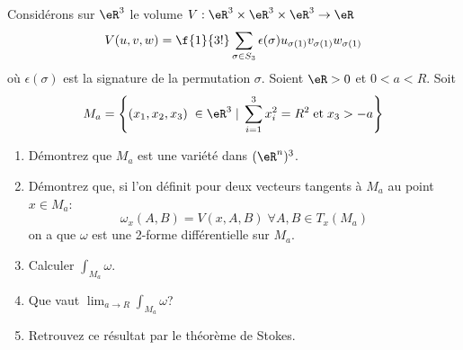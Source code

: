 
\begin{exercice}\label{exoVariete0020}

Considérons sur $\eR^3$ le volume $V:\eR^3\times\eR^3\times\eR^3\rightarrow \eR$ \[V(u,v,w)=\f{1}{3!}\sum_{\sigma\in S_3}\epsilon(\sigma)u_{\sigma(1)}v_{\sigma(1)}w_{\sigma(1)}\] où $\epsilon(\sigma)$ est la signature de la permutation $\sigma$. Soient $\eR>0$ et $0<a<R$. Soit \[M_a=\left\{ ( x_1, x_2, x_3)\; \in \eR^3 \; | \; \sum_{i=1}^3x_i^2 = R^2 \; {\rm et} \; x_3>-a\right\}\]
\begin{enumerate}
\item Démontrez que $M_a$ est une variété dans $(\eR^n)^3$.
\item Démontrez que, si l'on définit pour deux vecteurs tangents à $M_a$ au point $x\in M_a$: \[\omega_x(A,B)=V(x,A,B) \; \forall A, B \in T_x(M_a)\] on a que $\omega$ est une 2-forme différentielle sur $M_a$.
\item Calculer $\int_{M_a}\omega$.
\item Que vaut $\lim_{a\rightarrow  R} \int_{M_a}\omega$?
\item Retrouvez ce résultat par le théorème de Stokes.
\end{enumerate}


\end{exercice}
